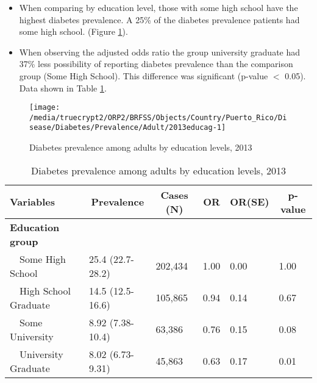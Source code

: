 \newpage
\begin{itemize}

\item When comparing by education level, those with
some high school
have the highest diabetes prevalence. A 25\% of the diabetes prevalence patients had some high school.
(Figure \ref{fig:edu.Diabetes.2013}).

\item 
When observing the adjusted odds ratio the group university graduate had 37\% less possibility of reporting diabetes prevalence than the comparison group (Some High School).
This difference was significant (p-value $<$ 0.05).  Data shown in Table \ref{tab:edu.Diabetes.2013}.

\end{itemize}

\begin{figure}[H]
\caption{Diabetes prevalence among adults by education levels, 
         2013}
\begin{knitrout}
\color{fgcolor}

{\centering \texttt{[image: /media/truecrypt2/ORP2/BRFSS/Objects/Country/Puerto\_Rico/Disease/Diabetes/Prevalence/Adult/2013educag-1]} 

}



\end{knitrout}
 \label{fig:edu.Diabetes.2013}
\end{figure}

\begin{table}[H]
\caption{Diabetes prevalence  among adults by education levels, 2013\label{tab:edu.Diabetes.2013}} 
\begin{center}
\begin{tabular}{llllll}
\hline\hline
\multicolumn{1}{l}{Variables}&\multicolumn{1}{c}{Prevalence}&\multicolumn{1}{c}{Cases (N)}&\multicolumn{1}{c}{OR}&\multicolumn{1}{c}{OR(SE)}&\multicolumn{1}{c}{p-value}\tabularnewline
\hline
{\bfseries Education group}&&&&&\tabularnewline
~~Some High School&25.4 (22.7-28.2)&202,434&1.00&0.00&1.00\tabularnewline
~~High School Graduate&14.5 (12.5-16.6)&105,865&0.94&0.14&0.67\tabularnewline
~~Some University&8.92 (7.38-10.4)& 63,386&0.76&0.15&0.08\tabularnewline
~~University Graduate&8.02 (6.73-9.31)& 45,863&0.63&0.17&0.01\tabularnewline
\hline
\end{tabular}\end{center}

\end{table}

